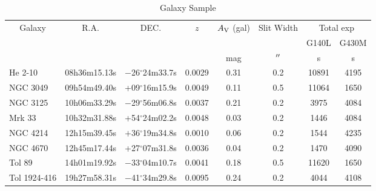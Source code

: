 %
\begin{table}[htp]
\begin{center}
\caption{Galaxy Sample \label{table:targets}}
\begin{tabular}{lccccccc}
\hline\hline
\multicolumn{1}{c}{Galaxy} & 
\multicolumn{1}{c}{R.A.} &
\multicolumn{1}{c}{DEC.} &
\multicolumn{1}{c}{$z$} & 
\multicolumn{1}{c}{$A_{\rm V}$ (gal)} &
\multicolumn{1}{c}{Slit Width }&
\multicolumn{2}{c}{Total exp} \\
& & & & & & \multicolumn{1}{c}{G140L} & \multicolumn{1}{c}{G430M} \\
& & & & \multicolumn{1}{c}{mag} & \multicolumn{1}{c}{$\mbox{$^{\prime\prime}$}$} & \multicolumn{1}{c}{s} & \multicolumn{1}{c}{s} \\
\hline
He 2-10      & 08h36m15.13s & $-$26$^{\circ}$24m33.7s & 0.0029 & 0.31 & 0.2 & 10891 & 4195 \\
NGC 3049     & 09h54m49.40s & +09$^{\circ}$16m15.9s & 0.0049 & 0.11 & 0.5 & 11064 & 1650 \\
NGC 3125     & 10h06m33.29s & $-$29$^{\circ}$56m06.8s & 0.0037 & 0.21 & 0.2 & 3975 & 4084 \\
Mrk 33       & 10h32m31.88s & +54$^{\circ}$24m02.2s & 0.0048 & 0.03 & 0.2 & 1446 & 4084 \\
NGC 4214     & 12h15m39.45s & $+$36$^{\circ}$19m34.8s & 0.0010 & 0.06 & 0.2 & 1544 & 4235 \\
NGC 4670     & 12h45m17.44s & +27$^{\circ}$07m31.8s & 0.0036 & 0.04 & 0.2 & 1470 & 4090 \\
Tol 89       & 14h01m19.92s & $-$33$^{\circ}$04m10.7s & 0.0041 & 0.18 & 0.5 & 11620 & 1650 \\
Tol 1924-416 & 19h27m58.31s & $-$41$^{\circ}$34m29.8s & 0.0095 & 0.24 & 0.2 & 4044 & 4108 \\  
\hline
\end{tabular} 
\end{center}
\end{table}
%